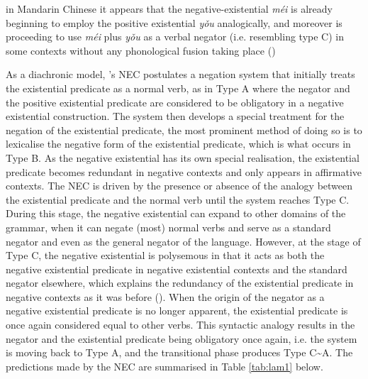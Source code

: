 \documentclass[output=paper]{langscibook}
\begin{document}
\begin{displayquote}
in Mandarin Chinese it appears that the negative-existential \textit{méi} is already beginning to employ the positive existential \textit{yǒu} analogically, and moreover is proceeding to use \textit{méi} plus \textit{yǒu} as a verbal negator (i.e. resembling type C) in some contexts without any phonological fusion taking place (\citealt[23]{Croft1991})
\end{displayquote}


As a diachronic model, \citeauthor{Croft1991}'s NEC postulates a negation system that initially treats the existential predicate as a normal verb, as in Type A where the negator and the positive existential predicate are considered to be obligatory in a negative existential construction. The system then develops a special treatment for the negation of the existential predicate, the most prominent method of doing so is to lexicalise the negative form of the existential predicate, which is what occurs in Type B. As the negative existential has its own special realisation, the existential predicate becomes redundant in negative contexts and only appears in affirmative contexts. The NEC is driven by the presence or absence of the analogy between the existential predicate and the normal verb until the system reaches Type C. During this stage, the negative existential can expand to other domains of the grammar, when it can negate (most) normal verbs and serve as a standard negator and even as the general negator of the language. However, at the stage of Type C, the negative existential is polysemous in that it acts as both the negative existential predicate in negative existential contexts and the standard negator elsewhere, which explains the redundancy of the existential predicate in negative contexts as it was before (\citealt[12]{Croft1991}). When the origin of the negator as a negative existential predicate is no longer apparent, the existential predicate is once again considered equal to other verbs. This syntactic analogy results in the negator and the existential predicate being obligatory once again, i.e. the system is moving back to Type A, and the transitional phase produces Type C\sim A. The predictions made by the NEC are summarised in Table \ref{tab:lam1} below.
\end{document}
